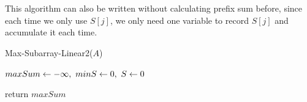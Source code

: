 \documentclass[11pt, a4paper]{COMP3711}
\begin{document}
\begin{spacing}{1.5}
    This algorithm can also be written without calculating prefix sum 
    before, since each time we only use $S[j]$, we only need one
    variable to record $S[j]$ and accumulate it each time.

    \begin{algorithm}
        \caption{Max-Subarray-Linear2($A$)}
        $maxSum \leftarrow -\infty,\ minS\leftarrow 0,\ S\leftarrow 0$

        return $maxSum$
    \end{algorithm}

\end{spacing}
\end{document}
